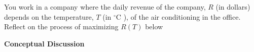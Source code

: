 \documentclass[10pt]{article}
\begin{document}
\pagestyle{otherpages}
\thispagestyle{firstpage}
\Large
You work in a company where the daily revenue of the company, $R$ (in dollars)  depends on the temperature, $T$ (in $^{\circ}$C ),  of the air conditioning in the office. Reflect on the process of maximizing $R(T)$ below


{\bf Conceptual Discussion}



\end{document}
